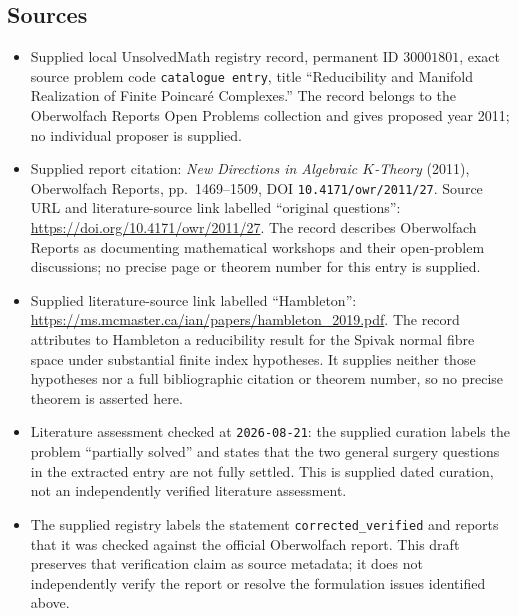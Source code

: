\documentclass[11pt]{article}
\begin{document}
\subsection{Sources}
\begin{itemize}
\item Supplied local UnsolvedMath registry record, permanent ID \(30001801\), exact source problem code \texttt{catalogue entry}, title ``Reducibility and Manifold Realization of Finite Poincar\'e Complexes.'' The record belongs to the Oberwolfach Reports Open Problems collection and gives proposed year 2011; no individual proposer is supplied.
\item Supplied report citation: \emph{New Directions in Algebraic \(K\)-Theory} (2011), Oberwolfach Reports, pp.\ 1469--1509, DOI \texttt{10.4171/owr/2011/27}. Source URL and literature-source link labelled ``original questions'': \url{https://doi.org/10.4171/owr/2011/27}. The record describes Oberwolfach Reports as documenting mathematical workshops and their open-problem discussions; no precise page or theorem number for this entry is supplied.
\item Supplied literature-source link labelled ``Hambleton'': \url{https://ms.mcmaster.ca/ian/papers/hambleton_2019.pdf}. The record attributes to Hambleton a reducibility result for the Spivak normal fibre space under substantial finite index hypotheses. It supplies neither those hypotheses nor a full bibliographic citation or theorem number, so no precise theorem is asserted here.
\item Literature assessment checked at \texttt{2026-08-21}: the supplied curation labels the problem ``partially solved'' and states that the two general surgery questions in the extracted entry are not fully settled. This is supplied dated curation, not an independently verified literature assessment.
\item The supplied registry labels the statement \texttt{corrected\_verified} and reports that it was checked against the official Oberwolfach report. This draft preserves that verification claim as source metadata; it does not independently verify the report or resolve the formulation issues identified above.
\end{itemize}
\end{document}
